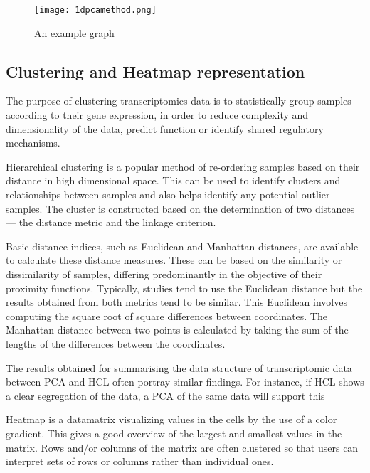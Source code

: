             \begin{figure}[h]
            \centering
            \texttt{[image: 1dpcamethod.png]}
            \caption{An example graph}
            \label{fig:1dpcamethod}
            \end{figure}
   
  
    \subsection{Clustering and Heatmap representation}
    
    
    The purpose of clustering transcriptomics data is to statistically group samples according to their gene expression, in order to reduce complexity and dimensionality of the data, predict function or identify shared regulatory mechanisms\cite{Metsalu2015ClustVis:Heatmap}.
    
    
    Hierarchical clustering is a popular method of re-ordering samples based
on their distance in high dimensional space. This can be used to identify clusters
and relationships between samples and also helps identify any potential outlier
samples. The cluster is constructed based on the determination of two distances
— the distance metric and the linkage criterion.

Basic distance indices, such as Euclidean and Manhattan distances, are
available to calculate these distance measures. These can be based on the
similarity or dissimilarity of samples, differing predominantly in the objective of
their proximity functions.
Typically, studies tend to use the Euclidean distance but the results obtained
from both metrics tend to be similar. This Euclidean  involves computing the square root of square differences between coordinates. The Manhattan distance
between two points is calculated by taking the sum of the lengths of the
differences between the coordinates.
    
    
    The results obtained for summarising the data structure of transcriptomic data
between PCA and HCL often portray similar findings. For instance, if HCL shows
a clear segregation of the data, a PCA of the same data will support this
    
    
    Heatmap is a datamatrix visualizing values in the cells by
the use of a color gradient. This gives a good overview of the largest and smallest values in the matrix. Rows and/or columns of the matrix are often clustered so that users can interpret sets of rows or columns rather than individual ones.


